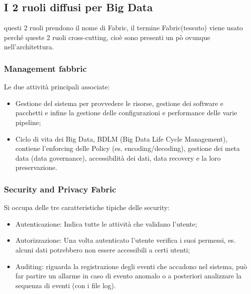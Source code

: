 \documentclass[11pt, twocolumn]{article}
\newenvironment{myitemize}
{ \begin{itemize}
		\setlength{\itemsep}{0pt}
		\setlength{\parskip}{0pt}
		\setlength{\parsep}{0pt}     }
	{ \end{itemize}                  }
\begin{document}
\subsection{I 2 ruoli diffusi per Big Data}
questi 2 ruoli prendono il nome di Fabric, il termine Fabric(tessuto) viene usato perché queste 2 ruoli cross-cutting, cioè sono presenti un pò ovunque nell'architettura.

\subsubsection{Management fabbric}
Le due attività principali associate:
\begin{myitemize}
	\item Gestione del sistema per provvedere le risorse, gestione dei software e pacchetti e infine la gestione delle configurazioni e performance delle varie pipeline;
	\item Ciclo di vita dei Big Data, BDLM (Big Data Life Cycle Management), contiene l'enforcing delle Policy (es. encoding/decoding), gestione dei meta data (data governance), accessibilità dei dati, data recovery e la loro preservazione.
\end{myitemize}


\subsubsection{Security and Privacy Fabric}
Si occupa delle tre caratteristiche tipiche delle security: 
\begin{myitemize}
	\item Autenticazione: Indica tutte le attività che validano l'utente;
	\item Autorizzazione: Una volta autenticato l'utente verifica i suoi permessi, es. alcuni dati potrebbero non essere accessibili a certi utenti;
	\item Auditing: riguarda la registrazione degli eventi che accadono nel sistema, può far partire un allarme in caso di evento anomalo o a posteriori analizzare la sequenza di eventi (con i file log).
\end{myitemize}
\end{document}
